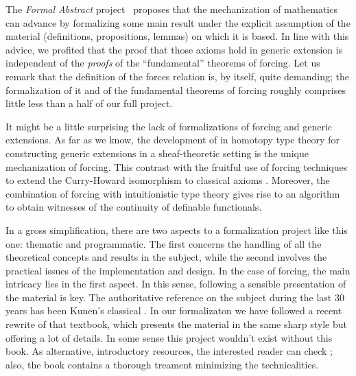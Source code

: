 The \emph{Formal Abstract} project~\cite{hales-fabstracts} proposes
that the mechanization of mathematics can advance by formalizing some
main result under the explicit assumption of the material
(definitions, propositions, lemmas) on which it is based. In line with
this advice, we profited that the proof that those axioms hold in
generic extension is independent of the \emph{proofs} of the
``fundamental'' theorems of forcing. Let us remark that the definition
of the forces relation is, by itself, quite demanding; the
formalization of it and of the fundamental theorems of forcing roughly
comprises little less than a half of our full project.

It might be a little surprising the lack of formalizations of forcing
and generic extensions. As far as we know, the development of
\citet{JFR6232} in homotopy type theory for constructing generic
extensions in a sheaf-theoretic setting is the unique mechanization of
forcing. This contrast with the fruitful use of forcing techniques to
extend the Curry-Howard isomorphism to classical axioms
\cite{Miquel:2011:FPT:2058525.2059614,lmcs:1070}. Moreover, the
combination of forcing with intuitionistic type theory
\cite{coquand2010note,coquand2012computational} gives rise to an
algorithm to obtain witnesses of the continuity of definable
functionals.



In a gross simplification, there are two aspects to a formalization
project like this one: thematic and programmatic. The first concerns
the handling of all the theoretical concepts and results in the
subject, while the second involves the practical issues of the
implementation and design. In the case of forcing, the main intricacy
lies in the first aspect. In this sense, following a sensible
presentation of the material is key.  The authoritative reference 
on the subject during the last 30 years has been Kunen's classical
\cite{kunen1980}. In our
formalizaton we have followed a recent rewrite \cite{kunen2011set}
of that  textbook, which presents the material in the same sharp 
style but offering a lot of details. In some sense this project
wouldn't exist without this book. As alternative, introductory
resources, the  interested reader can check
\cite{chow-beginner-forcing}; also, the book \cite{weaver2014forcing}
contains a thorough treament minimizing the technicalities.

